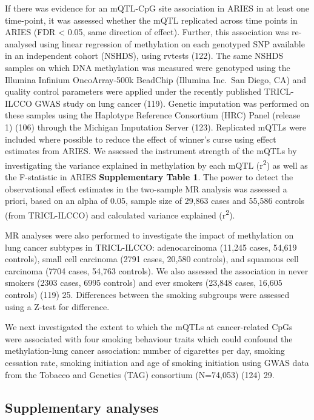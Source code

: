 \documentclass[11pt,twoside]{bristolthesis}
\begin{document}
If there was evidence for an mQTL-CpG site association in ARIES in at least one time-point, it was assessed whether the mQTL replicated across time points in ARIES (FDR \textless{} 0.05, same direction of effect). Further, this association was re-analysed using linear regression of methylation on each genotyped SNP available in an independent cohort (NSHDS), using rvtests (122). The same NSHDS samples on which DNA methylation was measured were genotyped using the Illumina Infinium OncoArray-500k BeadChip (Illumina Inc.~San Diego, CA) and quality control parameters were applied under the recently published TRICL-ILCCO GWAS study on lung cancer (119). Genetic imputation was performed on these samples using the Haplotype Reference Consortium (HRC) Panel (release 1) (106) through the Michigan Imputation Server (123). Replicated mQTLs were included where possible to reduce the effect of winner's curse using effect estimates from ARIES. We assessed the instrument strength of the mQTLs by investigating the variance explained in methylation by each mQTL (r\textsuperscript{2}) as well as the F-statistic in ARIES \textbf{Supplementary Table 1}. The power to detect the observational effect estimates in the two-sample MR analysis was assessed a priori, based on an alpha of 0.05, sample size of 29,863 cases and 55,586 controls (from TRICL-ILCCO) and calculated variance explained (r\textsuperscript{2}).

MR analyses were also performed to investigate the impact of methylation on lung cancer subtypes in TRICL-ILCCO: adenocarcinoma (11,245 cases, 54,619 controls), small cell carcinoma (2791 cases, 20,580 controls), and squamous cell carcinoma (7704 cases, 54,763 controls). We also assessed the association in never smokers (2303 cases, 6995 controls) and ever smokers (23,848 cases, 16,605 controls) (119) 25. Differences between the smoking subgroups were assessed using a Z-test for difference.

We next investigated the extent to which the mQTLs at cancer-related CpGs were associated with four smoking behaviour traits which could confound the methylation-lung cancer association: number of cigarettes per day, smoking cessation rate, smoking initiation and age of smoking initiation using GWAS data from the Tobacco and Genetics (TAG) consortium (N=74,053) (124) 29.

\hypertarget{supplementary-analyses}{%
\subsection{Supplementary analyses}\label{supplementary-analyses}}
\end{document}
